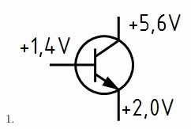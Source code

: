 \documentclass[8pt]{article}
\begin{document}
\begin{enumerate}
\begin{enumerate}[nolistsep,label=\Alph*]
{\begin{enumerate}[nolistsep,label=\Alph*]
\begin{enumerate}[nolistsep,label=\Alph*]
\begin{center}
	\end{center}
\item
	\begin{center}
		\begin{minipage}{\linewidth}
			\centering
			\includegraphics[scale=1.0]{pics/tc615_d.jpg}
		\end{minipage}
	\end{center}
\end{enumerate}


\end{enumerate}}
\end{enumerate}
\end{enumerate}
\end{document}
